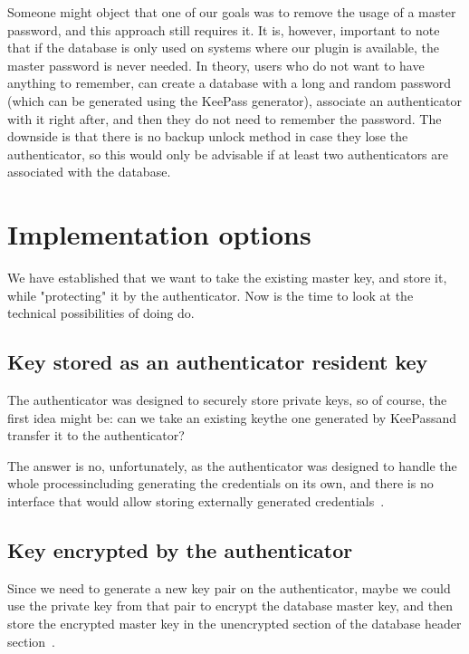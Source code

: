 Someone might object that one of our goals was to remove the usage of a master password,
and this approach still requires it. It is, however, important to note that if
the database is only used on systems where our plugin is available, the master password
is never needed. In theory, users who do not want to have anything to remember, can
create a database with a long and random password (which can be generated using the KeePass generator),
associate an authenticator with it right after, and then they do not need to remember the password.
The downside is that there is no backup unlock method in case they lose the authenticator, so this
would only be advisable if at least two authenticators are associated with the database.

\section{Implementation options}\label{sec:implementation-options}

We have established that we want to take the existing master key,
and store it, while "protecting" it by the authenticator. Now is the time to look at the technical possibilities of doing do.

\subsection{Key stored as an authenticator resident key}\label{subsec:key-stored-on-the-authenticator-as-a-resident-key}

The authenticator was designed to securely store private keys, so of course, the first idea might be:
can we take an existing key\textemdash the one generated by KeePass\textemdash and transfer it to the authenticator?

The answer is no, unfortunately, as the authenticator was designed to handle the whole process\textemdash including generating the credentials\textemdash
on its own, and there is no interface that would allow storing externally generated credentials~\cite{fido:ctap}.

\subsection{Key encrypted by the authenticator}\label{subsec:key-enrypted-by-the-authenticator}

Since we need to generate a new key pair on the authenticator, maybe we could use the private key from that pair
to encrypt the database master key, and then store the encrypted master key in the unencrypted section of the database header section~\cite{keepass:kdbx}.

